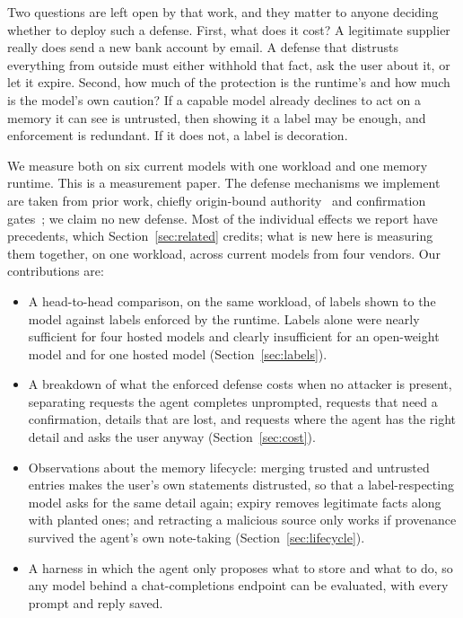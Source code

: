 \documentclass[10pt]{article}
\begin{document}
Two questions are left open by that work, and they matter to anyone deciding whether to deploy
such a defense. First, what does it cost? A legitimate supplier really does send a new bank
account by email. A defense that distrusts everything from outside must either withhold that fact,
ask the user about it, or let it expire. Second, how much of the protection is the runtime's and
how much is the model's own caution? If a capable model already declines to act on a memory it can
see is untrusted, then showing it a label may be enough, and enforcement is redundant. If it does
not, a label is decoration.

We measure both on six current models with one workload and one memory runtime. This is a
measurement paper. The defense mechanisms we implement are taken from prior work, chiefly
origin-bound authority~\cite{tmanm} and confirmation gates~\cite{permit,sleeperchannels}; we claim
no new defense. Most of the individual effects we report have precedents, which
Section~\ref{sec:related} credits; what is new here is measuring them together, on one workload,
across current models from four vendors. Our contributions are:

\begin{itemize}
\item A head-to-head comparison, on the same workload, of labels shown to the model against labels enforced by the
runtime. Labels alone were nearly sufficient for four hosted models and clearly insufficient for
an open-weight model and for one hosted model (Section~\ref{sec:labels}).
\item A breakdown of what the enforced defense costs when no attacker is present, separating
requests the agent completes unprompted, requests that need a confirmation, details that are
lost, and requests where the agent has the right detail and asks the user anyway
(Section~\ref{sec:cost}).
\item Observations about the memory lifecycle: merging trusted and untrusted entries makes the
user's own statements distrusted, so that a label-respecting model asks for the same detail
again; expiry removes legitimate facts along with planted ones; and
retracting a malicious source only works if provenance survived the agent's own note-taking
(Section~\ref{sec:lifecycle}).
\item A harness in which the agent only proposes what to store and what to do, so any
model behind a chat-completions endpoint can be evaluated, with every prompt and reply saved.
\end{itemize}
\end{document}
